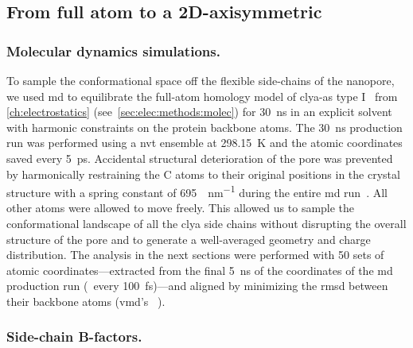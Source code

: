 \subsection{From full atom to a 2D-axisymmetric}
%
\label{sec:transport:pore_geometry}
%

\subsubsection{Molecular dynamics simulations.}
%

To sample the conformational space off the flexible side-chains of the nanopore, we used \gls{md} to
equilibrate the full-atom homology model of \gls{clya-as} type I~\cite{Soskine-2013} from
\cref{ch:electrostatics} (see~\cref{sec:elec:methods:molec}) for \SI{30}{\ns} in an explicit solvent with
harmonic constraints on the protein backbone atoms. The \SI{30}{\ns} production run was performed using a
\gls{nvt} ensemble at \SI{298.15}{\kelvin} and the atomic coordinates saved every \SI{5}{\ps}. Accidental
structural deterioration of the pore was prevented by harmonically restraining the C\ta{} atoms to their
original positions in the crystal structure with a spring constant of \SI{695}{\pN\per\nm} during the entire
\gls{md} run~\cite{Bhattacharya-2011}. All other atoms were allowed to move freely. This allowed us to sample
the conformational landscape of all the \gls{clya} side chains without disrupting the overall structure of the
pore and to generate a well-averaged geometry and charge distribution. The analysis in the next sections were
performed with 50 sets of atomic coordinates---extracted from the final \SI{5}{\ns} of the coordinates of the
\gls{md} production run (\ie~every \SI{100}{\fs})---and aligned by minimizing the \gls{rmsd} between their
backbone atoms (\gls{vmd}'s ~\cite{Humphrey-1996}).

\subsubsection{Side-chain B-factors.}
%


